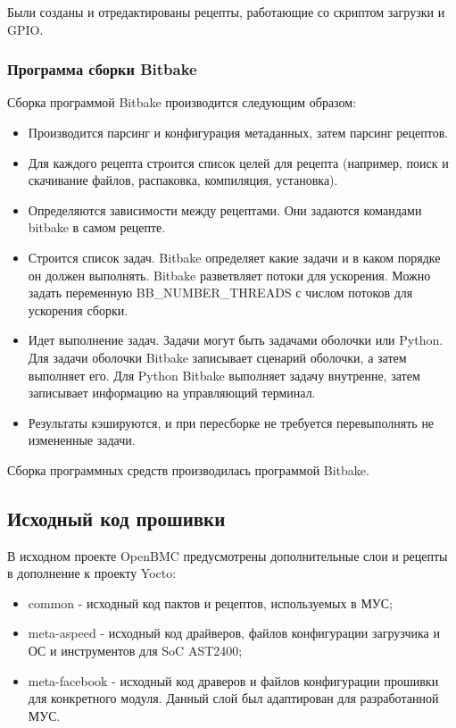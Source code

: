 Были созданы и отредактированы рецепты, работающие со скриптом загрузки и GPIO.

\subsubsection{Программа сборки Bitbake}

Сборка программой Bitbake производится следующим образом:
\begin{itemize}
	\item Производится парсинг и конфигурация метаданных, затем парсинг рецептов. 
	\item Для каждого рецепта строится список целей для рецепта (например, поиск и скачивание файлов, распаковка, компиляция, установка). 
	\item Определяются зависимости между рецептами. Они задаются командами bitbake в самом рецепте.
	\item Строится список задач. Bitbake определяет какие задачи и в каком порядке он должен выполнять. Bitbake разветвляет потоки для ускорения. Можно задать переменную BB\_NUMBER\_THREADS с числом потоков для ускорения сборки.
	\item Идет выполнение задач. Задачи могут быть задачами оболочки или Python. Для задачи оболочки Bitbake записывает сценарий оболочки, а затем выполняет его. Для Python Bitbake выполняет задачу внутренне, затем записывает информацию на управляющий терминал.
	\item Результаты кэшируются, и при пересборке не требуется перевыполнять не измененные задачи.
\end{itemize}

Сборка программных средств производилась программой Bitbake.

\subsection{Исходный код прошивки}

В исходном проекте OpenBMC предусмотрены дополнительные слои и рецепты в дополнение к проекту Yocto:

\begin{itemize}
	\item common - исходный код пактов и рецептов, используемых в МУС;
	\item meta-aspeed - исходный код драйверов, файлов конфигурации загрузчика и ОС и инструментов для SoC AST2400;
	\item meta-facebook - исходный код драверов и файлов конфигурации прошивки для конкретного модуля. Данный слой был адаптирован для разработанной МУС.
\end{itemize}

